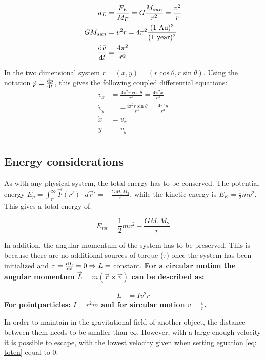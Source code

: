 \begin{align}
	{a}_E &= \frac{{F}_E}{M_E}= G\frac{M_{sun}}{r^2} 
= \frac{v^2}{r}\\
	GM_{sun}&= v^2 r = 4\pi^2 \frac{(\text{1 Au})^3}{(\text{1 year})^2}\\
	\dv{\tilde{v}}{\tilde{t}} &= \frac{4\pi^2}{\tilde{r}^2} \label{eq:}
\end{align}

In the two dimensional system $ r = (x,y) = (r\cos\theta, r\sin\theta) $. Using the notation $ 	\dot{p}  = \dv{p}{t}$, this gives the following coupled differential equations: 
\begin{align}
\dot{v}_x  &=  \frac{4\pi^2r\cos\theta}{{r}^3}  = \frac{4\pi^2x}{{r}^3} \\
\dot{v}_y	 &= -\frac{4\pi^2r\sin\theta}{{r}^3}  = \frac{4\pi^2y}{{r}^3}\\
	\dot{x}  &= v_x\\
	\dot{y}  &= v_y\\
\end{align}

\subsection{Energy considerations}

As with any physical system, the total energy has to be conserved. The potential energy $ E_p = \int_{r'}^{\infty} \vec{F}(r') \cdot  d\vec{r}' = -\frac{G	M_1M_2}{r} $, while the kinetic energy is $ E_K  = \frac{1}{2}mv^2$. This gives a total energy of:

\begin{equation}
	E_{tot} = \frac{1}{2}mv^2 - \frac{G	M_1M_2}{r} \label{eq: toten}
\end{equation}

 In addition, the angular momentum of the system has to be preserved. This is because there are no additional sources of torque ($ \tau $) once the system has been initialized and $ \tau = \dv{{L}}{t} =0 \Rightarrow  {L} =$ constant. 
\textbf{For a circular motion the angular momentum $	\vec{L} = m (\vec{r} \times \vec{v})$ can be described as:}

\begin{align}
	L &=  I v^2 r
\end{align}
\textbf{For pointparticles: $ 	I = r^2m $ and for sircular motion $ v = \frac{v}{r} $.}


In order to maintain in the gravitational field of another object, the distance between them needs to be smaller than $ \infty $. However, with a large enough velocity it is possible to escape, with the lowest velocity given when setting eguation \ref{eq: toten} equal to 0:

